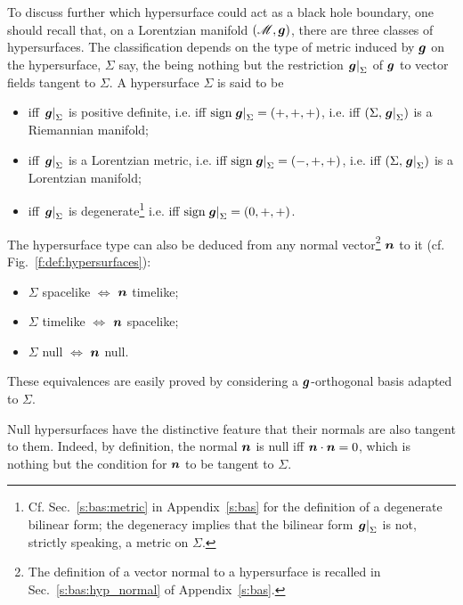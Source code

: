 To discuss further which hypersurface could act as a black hole boundary,
one should recall that, on a Lorentzian manifold $(\mathscr{M},\bm{g})$, there are
three classes of hypersurfaces. The classification
depends on the type of metric induced by $\bm{g}$ on the
hypersurface, $\Sigma$ say, the
 being
nothing but the restriction $\left.\bm{g}\right| _{\Sigma}$ of $\bm{g}$
to vector fields tangent to $\Sigma$.
A hypersurface $\Sigma$ is said to be
\begin{itemize}
\item {} iff $\left.\bm{g}\right| _{\Sigma}$ is positive definite,
i.e. iff $\mathrm{sign} \left.\bm{g}\right| _{\Sigma} = (+,+,+)$,
i.e. iff $(\Sigma,  \left.\bm{g}\right| _{\Sigma})$ is a Riemannian manifold;
\item {} iff $\left.\bm{g}\right| _{\Sigma}$ is a Lorentzian metric,
i.e. iff $\mathrm{sign} \left.\bm{g}\right| _{\Sigma} = (-,+,+)$,
i.e. iff $(\Sigma,  \left.\bm{g}\right| _{\Sigma})$ is a Lorentzian manifold;
\item {} iff $\left.\bm{g}\right| _{\Sigma}$ is degenerate\footnote{
Cf. Sec.~\ref{s:bas:metric} in Appendix~\ref{s:bas} for the definition of a
degenerate bilinear form; the degeneracy
implies that the bilinear form $\left.\bm{g}\right| _{\Sigma}$ is not,
strictly speaking, a metric on $\Sigma$.}
i.e. iff $\mathrm{sign} \left.\bm{g}\right| _{\Sigma} = (0,+,+)$.
\end{itemize}
The hypersurface type can also be deduced from any normal vector\footnote{
The definition of a vector normal to a hypersurface is recalled in Sec.~\ref{s:bas:hyp_normal} of Appendix~\ref{s:bas}.}
$\bm{n}$ to it (cf. Fig.~\ref{f:def:hypersurfaces}):
\begin{itemize}
\item $\Sigma$ spacelike $\iff$ $\bm{n}$ timelike;
\item $\Sigma$ timelike $\iff$ $\bm{n}$ spacelike;
\item $\Sigma$ null $\iff$ $\bm{n}$ null.
\end{itemize}
These equivalences are easily proved by considering a $\bm{g}$-orthogonal basis
adapted to $\Sigma$.

\begin{remark}
Null hypersurfaces have the distinctive feature that their normals are
also tangent to them. Indeed, by definition, the normal $\bm{n}$ is null iff
$\bm{n}\cdot\bm{n}=0$, which is nothing but the condition
for $\bm{n}$ to be tangent to $\Sigma$.
\end{remark}

